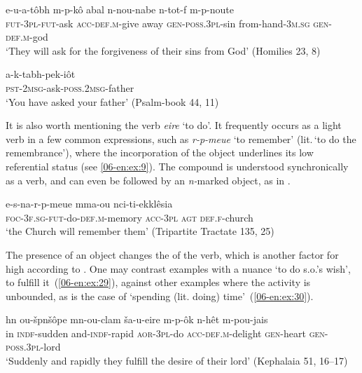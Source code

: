 \documentclass[output=paper]{LSP/langsci}
\begin{document}
\begin{exe}
\ex \label{06-en:ex:26}
\gll e-u-a-tôbh 		m-p-kô 			abal 	n-n{\ob}ou-nabe{\cb} n-tot-f 				m-p-noute\\
	\textsc{fut-3pl-fut-}ask \textsc{acc-def.m-}give away \textsc{gen-poss.3pl-}sin from-hand-\textsc{3m.sg} \textsc{gen-def.m-}god\\
\glt ‘They will ask for the forgiveness of their sins from God’ (Homilies 23, 8)
\end{exe}

\begin{exe}
\ex \label{06-en:ex:27}
\gll a-k-tabh-pek-iôt\\
	\textsc{pst-2msg-}ask-\textsc{poss.2msg-}father\\
\glt ‘You have asked your father’ (Psalm-book 44, 11)
\end{exe}

It is also worth mentioning the verb \textit{eire} ‘to do’. It frequently occurs as a light verb in a few common expressions, such as \textit{r-p-meue} ‘to remember’ (lit.\,‘to do the remembrance’), where the incorporation of the object underlines its low referential status (see \ref{06-en:ex:9}). The compound is understood synchronically as a verb, and can even be followed by an \textit{n-}marked object, as in . 

\begin{exe}
\ex \label{06-en:ex:28}
\gll e-s-na-r-p-meue 		mma-ou 	nci-ti-ekklêsia\\
	\textsc{foc-3f.sg-fut-}do-\textsc{def}.\textsc{m-}memory \textsc{acc-3pl} \textsc{agt def.f-}church\\
\glt ‘the Church will remember them’ (Tripartite Tractate 135, 25)
\end{exe}

The presence of an object changes the  of the verb, which is another factor for high  according to \citet{Hopperetal1980Transitivity}. One may contrast examples with a nuance ‘to do s.o.’s wish’, \ie  to fulfill it~(\ref{06-en:ex:29}), against other examples where the activity is unbounded, as is the case of ‘spending (lit. doing) time’~(\ref{06-en:ex:30}).

\begin{exe}
\ex \label{06-en:ex:29}
\gll hn 	ou-špnšôpe 	mn-ou-{\ob}c{\cb}lam  ša-u-eire 		m-p-ôk 		n-hêt 		m-pou-jais\\
	in \textsc{indf-}sudden and-\textsc{indf-}rapid \textsc{aor-}3\textsc{pl-}do \textsc{acc-def.m-}delight \textsc{gen-}heart \textsc{gen-poss.3pl-}lord\\
\glt  ‘Suddenly and rapidly they fulfill the desire of their lord’ (Kephalaia 51, 16–17)
\end{exe}
\end{document}
